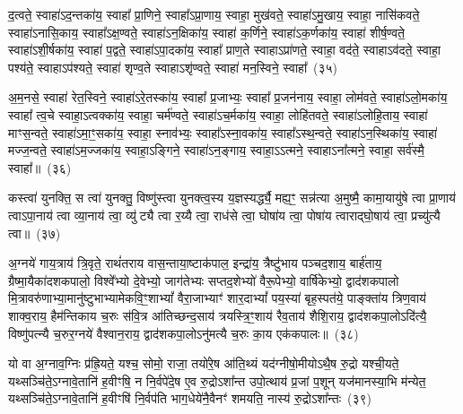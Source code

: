 {%
{\anuvakamend[{सं॒ वर्\mbox{}ष॑ते॒ रैभी᳚भ्यः॒ स्वाहा॒ द्वे च॑}]}%

द॒त्वते॒ स्वाहा॑\-ऽद॒न्तका॑य॒ स्वाहा᳚ प्रा॒णिने॒ स्वाहा᳚\-ऽप्रा॒णाय॒ स्वाहा॒ मुख॑वते॒ स्वाहा॑\-ऽमु॒खाय॒ स्वाहा॒ नासि॑कवते॒ स्वाहा॑\-ऽनासि॒काय॒ स्वाहा᳚\-ऽक्ष॒ण्वते॒ स्वाहा॑\-ऽन॒क्षिका॑य॒ स्वाहा॑ क॒र्णिने॒ स्वाहा॑\-ऽक॒र्णका॑य॒ स्वाहा॑ शीर्\mbox{}ष॒ण्वते॒ स्वाहा॑\-ऽ\-शी॒र्\mbox{}षका॑य॒ स्वाहा॑ प॒द्वते॒ स्वाहा॑\-ऽपा॒दका॑य॒ स्वाहा᳚ प्राण॒ते स्वाहा\-ऽप्रा॑णते॒ स्वाहा॒ वद॑ते॒ स्वाहा\-ऽव॑दते॒ स्वाहा॒ पश्य॑ते॒ स्वाहा\-ऽप॑श्यते॒ स्वाहा॑ शृण्व॒ते स्वाहा\-ऽशृ॑ण्वते॒ स्वाहा॑ मन॒स्विने॒ स्वाहा᳚~(३५)

अ॒म॒नसे॒ स्वाहा॑ रेत॒स्विने॒ स्वाहा॑\-ऽरे॒तस्का॑य॒ स्वाहा᳚ प्र॒जाभ्यः॒ स्वाहा᳚ प्र॒जन॑नाय॒ स्वाहा॒ लोम॑वते॒ स्वाहा॑\-ऽलो॒मका॑य॒ स्वाहा᳚ त्व॒चे स्वाहा॒\-ऽत्वक्का॑य॒ स्वाहा॒ चर्म॑ण्वते॒ स्वाहा॑\-ऽच॒र्मका॑य॒ स्वाहा॒ लोहि॑तवते॒ स्वाहा॑\-ऽलोहि॒ताय॒ स्वाहा॑ माꣳस॒न्वते॒ स्वाहा॑\-ऽमा॒ꣳ॒सका॑य॒ स्वाहा॒ स्नाव॑भ्यः॒ स्वाहा᳚\-ऽस्ना॒वका॑य॒ स्वाहा᳚\-ऽस्थ॒न्वते॒ स्वाहा॑\-ऽन॒स्थिका॑य॒ स्वाहा॑ मज्ज॒न्वते॒ स्वाहा॑\-ऽम॒ज्जका॑य॒ स्वाहा॒\-ऽङ्गिने॒ स्वाहा॑\-ऽन॒ङ्गाय॒ स्वाहा॒\-ऽ\-ऽत्मने॒ स्वाहा\-ऽना᳚त्मने॒ स्वाहा॒ सर्व॑स्मै॒ स्वाहा᳚॥~(३६)

{\anuvakamend[{म॒न॒स्विने॒ स्वाहा\-ऽना᳚त्मने॒ स्वाहा॒ द्वे च॑}]}%

कस्त्वा॑ युनक्ति॒ स त्वा॑ युनक्तु॒ विष्णु॑स्त्वा युनक्त्व॒स्य य॒ज्ञस्यर्द्ध्यै॒ मह्य॒ꣳ॒ सन्न॑त्या अ॒मुष्मै॒ कामा॒यायु॑षे त्वा प्रा॒णाय॑ त्वा\-ऽपा॒नाय॑ त्वा व्या॒नाय॑ त्वा॒ व्यु॑ट्यै त्वा र॒य्यै त्वा॒ राध॑से त्वा॒ घोषा॑य त्वा॒ पोषा॑य त्वाराद्घो॒षाय॑ त्वा॒ प्रच्यु॑त्यै त्वा॥~(३७)

{\anuvakamend[{कस्त्वा॒\-ऽष्टात्रिꣳ॑शत्}]}%

अ॒ग्नये॑ गाय॒त्राय॑ त्रि॒वृते॒ राथं॑तराय वास॒न्ताया॒ष्टाक॑पाल॒ इन्द्रा॑य॒ त्रैष्टु॑भाय पञ्चद॒शाय॒ बार्\mbox{}ह॑ताय॒ ग्रैष्मा॒यैका॑\-दश\-कपालो॒ विश्वे᳚भ्यो दे॒वेभ्यो॒ जाग॑तेभ्यः सप्तद॒शेभ्यो॑ वैरू॒पेभ्यो॒ वार्\mbox{}षि॑केभ्यो॒ द्वाद॑श\-कपालो मि॒त्रावरु॑णाभ्या॒मानु॑ष्टुभाभ्यामेक\-वि॒ꣳ॒शा\-भ्यां᳚ वैरा॒जाभ्याꣳ॑ शार॒दा\-भ्यां᳚ पय॒स्या॑ बृह॒स्पत॑ये॒ पाङ्क्ता॑य त्रिण॒वाय॑ शाक्व॒राय॒ हैम॑न्तिकाय च॒रुः स॑वि॒त्र आ॑तिच्छन्द॒साय॑ त्रयस्त्रि॒ꣳ॒शाय॑ रैव॒ताय॑ शैशि॒राय॒ द्वाद॑श\-कपा॒लो\-ऽदि॑त्यै॒ विष्णु॑पत्न्यै च॒रुर॒ग्नये॑ वैश्वान॒राय॒ द्वाद॑श\-कपा॒लो\-ऽनु॑मत्यै च॒रुः का॒य एक॑कपालः॥~(३८)

{\anuvakamend[{अ॒ग्नये\-ऽदि॑त्या॒ अनु॑मत्यै स॒प्तच॑त्वारिꣳशत्}]}%

यो वा अ॒ग्नाव॒ग्निः प्र॑ह्रि॒यते॒ यश्च॒ सोमो॒ राजा॒ तयो॑रे॒ष आ॑ति॒थ्यं यद॑ग्नीषो॒मीयो\-ऽथै॒ष रु॒द्रो यश्ची॒यते॒ यथ्सञ्चि॑ते॒\-ऽग्नावे॒तानि॑ ह॒वीꣳषि॒ न नि॒र्वपे॑दे॒ष ए॒व रु॒द्रो\-ऽशा᳚न्त उपो॒त्थाय॑ प्र॒जां प॒शून् यज॑मानस्या॒भि म॑न्येत॒ यथ्सञ्चि॑ते॒\-ऽग्नावे॒तानि॑ ह॒वीꣳषि॑ नि॒र्वप॑ति भाग॒धेये॑नै॒वैनꣳ॑ शमयति॒ नास्य॑ रु॒द्रो\-ऽशा᳚न्तः~(३९)

}

